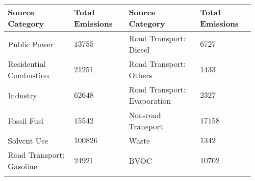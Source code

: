 \begin{tabular}{ll|ll}
    \hline \hline
    \textbf{Source Category} & \textbf{Total Emissions} & \textbf{Source Category} & \textbf{Total Emissions} \\ \hline
    Public Power & $13755$ & Road Transport: Diesel & $6727$ \\
    Residential Combustion & $21251$ & Road Transport: Others & $1433$ \\
    Industry & $62648$ & Road Transport: Evaporation & $2327$ \\
    Fossil Fuel & $15542$ & Non-road Transport & $17158$ \\
    Solvent Use & $100826$ & Waste & $1342$ \\
    Road Transport: Gasoline & $24921$ & BVOC & $10702$ \\
    \hline \hline
    \label{t:NMVOC_emissions}%
\end{tabular}%
